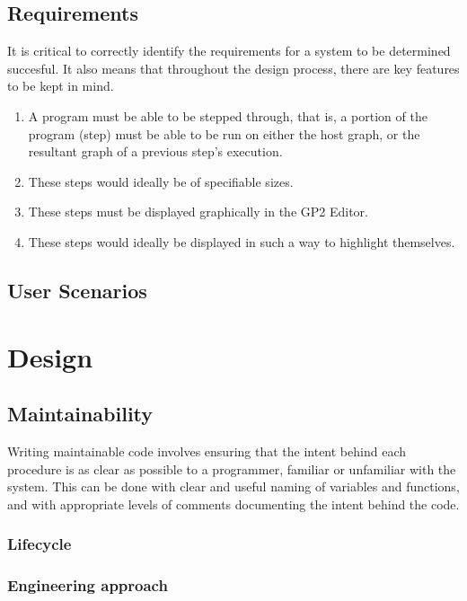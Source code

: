 \documentclass{UoYCSproject}
\begin{document}
\subsection{Requirements}

It is critical to correctly identify the requirements for a system to be determined succesful. It also means that throughout the design process, there are key features to be kept in mind. 
\begin{enumerate}
	\item A program must be able to be stepped through, that is, a portion of the program (step) must be able to be run on either the host graph, or the resultant graph of a previous step's execution.
	\item These steps would ideally be of specifiable sizes.
	\item These steps must be displayed graphically in the GP2 Editor.
	\item These steps would ideally be displayed in such a way to highlight themselves.
\end{enumerate}

\subsection{User Scenarios}


\section{Design}


\subsection{Maintainability}
Writing maintainable code involves ensuring that the intent behind each procedure is as clear as possible to a programmer, familiar or unfamiliar with the system. This can be done with clear and useful naming of variables and functions, and with appropriate levels of comments documenting the intent behind the code.

\subsubsection{Lifecycle}
\subsubsection{Engineering approach}
 
\end{document}

